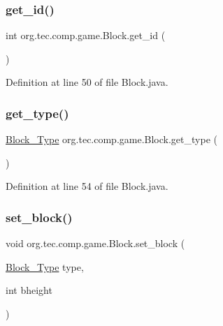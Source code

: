 \subsubsection{\texorpdfstring{get\+\_\+id()}{get\_id()}}
{\footnotesize\ttfamily int org.\+tec.\+comp.\+game.\+Block.\+get\+\_\+id (\begin{DoxyParamCaption}{ }\end{DoxyParamCaption})\hspace{0.3cm}{\ttfamily [inline]}}



Definition at line 50 of file Block.\+java.

\mbox{\label{classorg_1_1tec_1_1comp_1_1game_1_1_block_a988225960b535c3feb106250ffeee81f}} 
\subsubsection{\texorpdfstring{get\+\_\+type()}{get\_type()}}
{\footnotesize\ttfamily \mbox{\hyperlink{enumorg_1_1tec_1_1comp_1_1game_1_1_block___type}{Block\+\_\+\+Type}} org.\+tec.\+comp.\+game.\+Block.\+get\+\_\+type (\begin{DoxyParamCaption}{ }\end{DoxyParamCaption})\hspace{0.3cm}{\ttfamily [inline]}}



Definition at line 54 of file Block.\+java.

\mbox{\label{classorg_1_1tec_1_1comp_1_1game_1_1_block_aa387f6f79daa3d927a37137fda4a18f8}} 
\subsubsection{\texorpdfstring{set\+\_\+block()}{set\_block()}}
{\footnotesize\ttfamily void org.\+tec.\+comp.\+game.\+Block.\+set\+\_\+block (\begin{DoxyParamCaption}\item[{\mbox{\hyperlink{enumorg_1_1tec_1_1comp_1_1game_1_1_block___type}{Block\+\_\+\+Type}}}]{type,  }\item[{int}]{bheight }\end{DoxyParamCaption})\hspace{0.3cm}{\ttfamily [inline]}}



